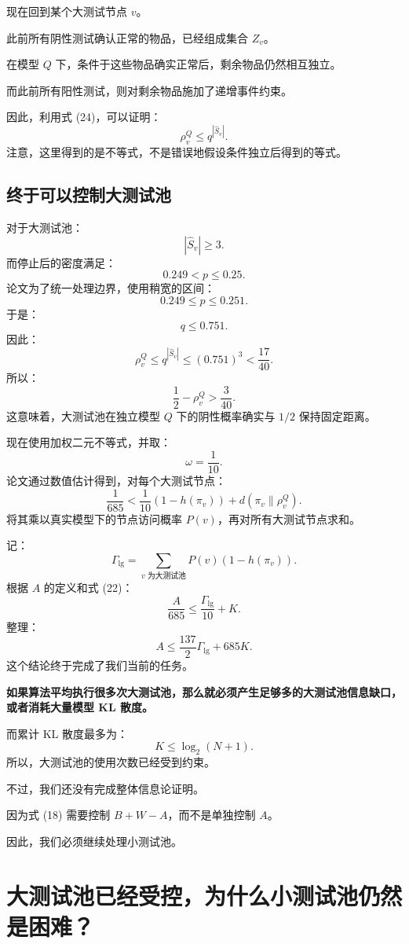 \documentclass[UTF8,11pt]{ctexart}
\begin{document}
现在回到某个大测试节点 $v$。

此前所有阴性测试确认正常的物品，已经组成集合 $Z_v$。

在模型 $Q$ 下，条件于这些物品确实正常后，剩余物品仍然相互独立。

而此前所有阳性测试，则对剩余物品施加了递增事件约束。

因此，利用式 (24)，可以证明：
\begin{equation}\boxed{\rho_v^Q\le q^{|\widehat S_v|}.}\tag{25}\end{equation}
注意，这里得到的是不等式，不是错误地假设条件独立后得到的等式。

\subsection{终于可以控制大测试池}
对于大测试池：
\[|\widehat S_v|\ge3.\]
而停止后的密度满足：
\[0.249<p\le0.25.\]
论文为了统一处理边界，使用稍宽的区间：
\[0.249\le p\le0.251.\]
于是：
\[q\le0.751.\]
因此：
\[\rho_v^Q\le q^{|\widehat S_v|}\le(0.751)^3<\frac{17}{40}.\]
所以：
\begin{equation}\boxed{\frac12-\rho_v^Q>\frac3{40}.}\tag{26}\end{equation}
这意味着，大测试池在独立模型 $Q$ 下的阴性概率确实与 $1/2$ 保持固定距离。

现在使用加权二元不等式，并取：
\[\omega=\frac1{10}.\]
论文通过数值估计得到，对每个大测试节点：
\[\frac1{685}<\frac1{10}(1-h(\pi_v))+d(\pi_v\|\rho_v^Q).\]
将其乘以真实模型下的节点访问概率 $P(v)$，再对所有大测试节点求和。

记：
\[\Gamma_{\mathrm{lg}}=\sum_{v\text{ 为大测试池}}P(v)(1-h(\pi_v)).\]
根据 $A$ 的定义和式 (22)：
\[\frac A{685}\le\frac{\Gamma_{\mathrm{lg}}}{10}+K.\]
整理：
\begin{equation}\boxed{A\le\frac{137}{2}\Gamma_{\mathrm{lg}}+685K.}\tag{27}\end{equation}
这个结论终于完成了我们当前的任务。

\textbf{如果算法平均执行很多次大测试池，那么就必须产生足够多的大测试池信息缺口，或者消耗大量模型 KL 散度。}

而累计 KL 散度最多为：
\[K\le\log_2(N+1).\]
所以，大测试池的使用次数已经受到约束。

不过，我们还没有完成整体信息论证明。

因为式 (18) 需要控制 $B+W-A$，而不是单独控制 $A$。

因此，我们必须继续处理小测试池。

\section{大测试池已经受控，为什么小测试池仍然是困难？}
\end{document}
